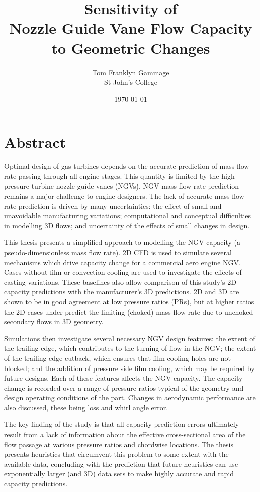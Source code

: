 \documentclass[a4paper, 11pt, oneside]{report}
\title{Sensitivity of\\Nozzle Guide Vane Flow Capacity\\to Geometric Changes}
\author{Tom Franklyn Gammage\\St John's College}
\date{\mydate\today}
\begin{document}
\maketitle



\chapter*{Abstract}


Optimal design of gas turbines depends on the accurate prediction of mass flow rate passing through all engine stages. This quantity is limited by the high-pressure turbine nozzle guide vanes (NGVs). NGV mass flow rate prediction remains a major challenge to engine designers. The lack of accurate mass flow rate prediction is driven by many uncertainties: the effect of small and unavoidable manufacturing variations; computational and conceptual difficulties in modelling 3D flows; and uncertainty of the effects of small changes in design. 

This thesis presents a simplified approach to modelling the NGV capacity (a pseudo-dimensionless mass flow rate). 2D CFD is used to simulate several mechanisms which drive capacity change for a commercial aero engine NGV. Cases without film or convection cooling are used to investigate the effects of casting variations. These baselines also allow comparison of this study's 2D capacity predictions with the manufacturer's 3D predictions. 2D and 3D are shown to be in good agreement at low pressure ratios (PRs), but at higher ratios the 2D cases under-predict the limiting (choked) mass flow rate due to unchoked secondary flows in 3D geometry.

Simulations then investigate several necessary NGV design features: the extent of the trailing edge, which contributes to the turning of flow in the NGV; the extent of the trailing edge cutback, which ensures that film cooling holes are not blocked; and the addition of pressure side film cooling, which may be required by future designs. Each of these features affects the NGV capacity. The capacity change is recorded over a range of pressure ratios typical of the geometry and design operating conditions of the part. Changes in aerodynamic performance are also discussed, these being loss and whirl angle error.

The key finding of the study is that all capacity prediction errors ultimately result from a lack of information about the effective cross-sectional area of the flow passage at various pressure ratios and chordwise locations. The thesis presents heuristics that circumvent this problem to some extent with the available data, concluding with the prediction that future heuristics can use exponentially larger (and 3D) data sets to make highly accurate and rapid capacity predictions.
\end{document}
